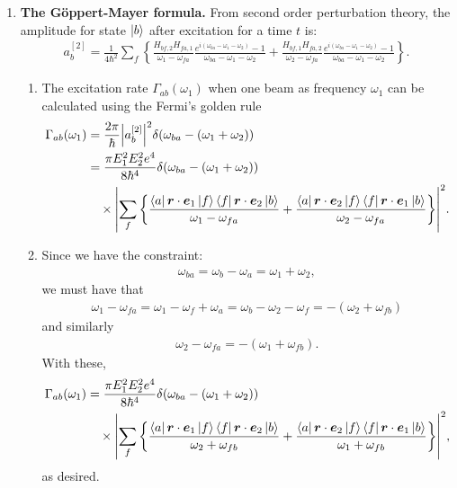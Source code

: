 \documentclass{article}
\theoremstyle{definition}
\newcommand{\f}[2]{\frac{#1}{#2}}
\newcommand{\lc}{\left\{}
\newcommand{\rc}{\right\}}
\begin{document}
\begin{enumerate}
	\item \textbf{The G\"{o}ppert-Mayer formula.} From second order perturbation theory, the amplitude for state $\ket{b}$ after excitation for a time $t$ is: 
	\begin{align*}
	a^{[2]}_b = \f{1}{4\hbar^2}\sum_f \lc \f{H_{bf,2}H_{fa,1}}{\omega_1 - \omega_{fa}}\f{e^{i(\omega_{ba} - \omega_1 - \omega_2)} - 1}{\omega_{ba} - \omega_1 - \omega_2} 
	+
	\f{H_{bf,1}H_{fa,2}}{\omega_2 - \omega_{fa}}\f{e^{i(\omega_{ba} - \omega_1 - \omega_2)} - 1}{\omega_{ba} - \omega_1 - \omega_2}
	\rc.
	\end{align*}
	
	
	\begin{enumerate}[label=(\roman*)]
		\item The excitation rate $\Gamma_{ab}(\omega_1)$ when one beam as frequency $\omega_1$ can be calculated using  the Fermi's golden rule
		\begin{align*}
		\Gamma_{ab}(\omega_1) 
		&= \f{2\pi}{\hbar}\abs{a_b^{[2]}}^2 \delta(\omega_{ba} - (\omega_1 + \omega_2)) \\
		&= \f{\pi E_1^2 E_2^2 e^4}{8\hbar^4}\delta(\omega_{ba} - (\omega_1 + \omega_2)) \\
		&\quad \times \abs{ \sum_f 
			\lc 
			\f{\bra{a} \bm{r}\cdot \bm{e}_1\ket{f}\bra{f} \bm{r}\cdot {\bm{e}}_2 \ket{b}}{\omega_1 - \omega_{fa}} + 
			\f{\bra{a} \bm{r}\cdot \bm{e}_2\ket{f}\bra{f} \bm{r}\cdot {\bm{e}}_1 \ket{b}}{\omega_2 - \omega_{fa}}
			\rc }^2.
		\end{align*}
		
		\item Since we have the constraint:
		\begin{align*}
		\omega_{ba} = \omega_b - \omega_a = \omega_1 + \omega_2, 
		\end{align*}
		we must have that
		\begin{align*}
		\omega_1 - \omega_{fa} = \omega_1 - \omega_f + \omega_a = \omega_{b} - \omega_2 - \omega_f = -(\omega_2 + \omega_{fb})
		\end{align*}
		and similarly
		\begin{align*}
		\omega_2 - \omega_{fa} = -(\omega_{1} + \omega_{fb}).
		\end{align*}
		With these, 
		\begin{align*}
		\Gamma_{ab}(\omega_1) 
		&= \f{\pi E_1^2 E_2^2 e^4}{8\hbar^4}\delta(\omega_{ba} - (\omega_1 + \omega_2)) \\
		&\quad \times \abs{ \sum_f 
			\lc 
			\f{\bra{a} \bm{r}\cdot \bm{e}_1\ket{f}\bra{f} \bm{r}\cdot {\bm{e}}_2 \ket{b}}{\omega_2 + \omega_{fb}} + 
			\f{\bra{a} \bm{r}\cdot \bm{e}_2\ket{f}\bra{f} \bm{r}\cdot {\bm{e}}_1 \ket{b}}{\omega_{1} + \omega_{fb}}
			\rc }^2,
		\end{align*}
		as desired. 
		

\end{enumerate}
\end{enumerate}
\end{document}
